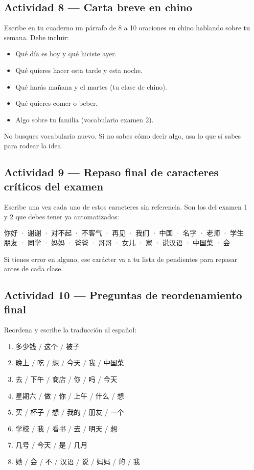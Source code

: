 \documentclass[12pt, a4paper]{article}
\begin{document}
\subsection{Actividad 8 — Carta breve en chino}

Escribe en tu cuaderno un párrafo de 8 a 10 oraciones en chino hablando sobre tu semana. Debe incluir:

\begin{itemize}[leftmargin=1.5cm]
\item Qué día es hoy y qué hiciste ayer.
\item Qué quieres hacer esta tarde y esta noche.
\item Qué harás mañana y el martes (tu clase de chino).
\item Qué quieres comer o beber.
\item Algo sobre tu familia (vocabulario examen 2).
\end{itemize}

No busques vocabulario nuevo. Si no sabes cómo decir algo, usa lo que sí sabes para rodear la idea.

\subsection{Actividad 9 — Repaso final de caracteres críticos del examen}

Escribe una vez cada uno de estos caracteres sin referencia. Son los del examen 1 y 2 que debes tener ya automatizados:

\begin{cuadrogris}
你好 · 谢谢 · 对不起 · 不客气 · 再见 · 我们 · 中国 · 名字 · 老师 · 学生\\
朋友 · 同学 · 妈妈 · 爸爸 · 哥哥 · 女儿 · 家 · 说汉语 · 中国菜 · 会
\end{cuadrogris}

Si tienes error en alguno, ese carácter va a tu lista de pendientes para repasar antes de cada clase.

\subsection{Actividad 10 — Preguntas de reordenamiento final}

Reordena y escribe la traducción al español:

\begin{enumerate}[leftmargin=1.5cm]
\item 多少钱 / 这个 / 被子
\item 晚上 / 吃 / 想 / 今天 / 我 / 中国菜
\item 去 / 下午 / 商店 / 你 / 吗 / 今天
\item 星期六 / 做 / 你 / 上午 / 什么 / 想
\item 买 / 杯子 / 想 / 我的 / 朋友 / 一个
\item 学校 / 我 / 看书 / 去 / 明天 / 想
\item 几号 / 今天 / 是 / 几月
\item 她 / 会 / 不 / 汉语 / 说 / 妈妈 / 的 / 我
\end{enumerate}
\end{document}
